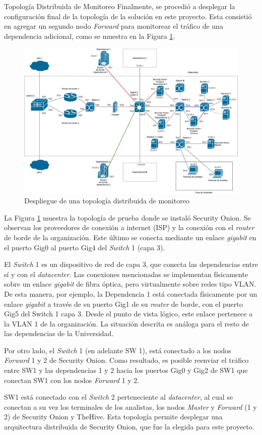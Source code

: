 \begin{subsection}{Topología Distribuida de Monitoreo}
    Finalmente, se procedió a desplegar la configuración final de la topología de la solución en este proyecto. Esta consistió en agregar un segundo nodo \textit{Forward} para monitorear el tráfico de una dependencia adicional, como se muestra en la Figura \ref{fig:iter1_top_d_unc}.
    \begin{figure}[H]
    \centering
    \includegraphics[width=1\textwidth]{./iteracion_1_imagenes/figura_topologia_d_unc.png}
    \caption{Despliegue de una topología distribuida de monitoreo}
    \label{fig:iter1_top_d_unc}
    \end{figure}
    La Figura \ref{fig:iter1_top_d_unc} muestra la topología de prueba donde se instaló Security Onion. Se observan los proveedores de conexión a internet (ISP) y la conexión con el \textit{router} de borde de la organización. Este último se conecta mediante un enlace \textit{gigabit} en el puerto Gig0 al puerto Gig4 del \textit{Switch} 1 (capa 3). \par
    El \textit{Switch} 1 es un dispositivo de red de capa 3, que conecta las dependencias entre sí y con el \textit{datacenter}. Las conexiones mencionadas se implementan físicamente sobre un enlace \textit{gigabit} de fibra óptica, pero virtualmente sobre redes tipo VLAN. De esta manera, por ejemplo, la Dependencia 1 está conectada físicamente por un enlace \textit{gigabit} a través de su puerto Gig1 de su \textit{router} de borde, con el puerto Gig5 del Switch 1 capa 3. Desde el punto de vista lógico, este enlace pertenece a la VLAN 1 de la organización. La situación descrita es análoga para el resto de las dependencias de la Universidad. \par
    Por otro lado, el \textit{Switch} 1 (en adelante SW 1), está conectado a los nodos \textit{Forward} 1 y 2 de Security Onion. Como resultado, es posible reenviar el tráfico entre SW1 y las dependencias 1 y 2 hacia los puertos Gig0 y Gig2 de SW1 que conectan SW1 con los nodos \textit{Forward} 1 y 2. \par
    SW1 está conectado con el \textit{Switch} 2 perteneciente al \textit{datacenter}, al cual se conectan a su vez los terminales de los analistas, los nodos \textit{Master} y \textit{Forward} (1 y 2) de Security Onion y TheHive. Esta topología permite desplegar una arquitectura distribuida de Security Onion, que fue la elegida para este proyecto.
    \end{subsection}
